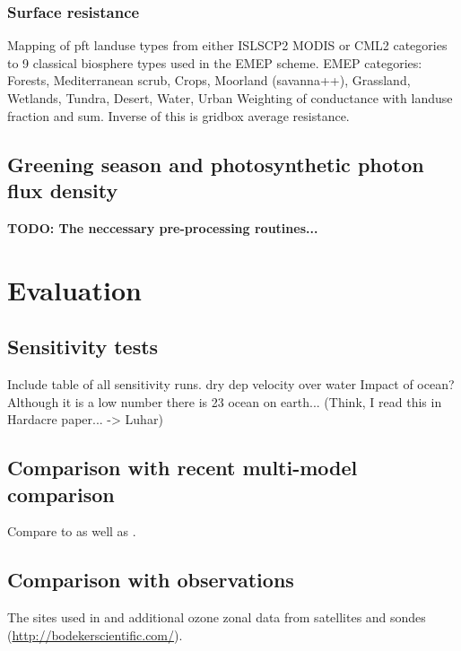 \documentclass[gmd, manuscript]{copernicus}
\begin{document}
\subsubsection{Surface resistance}
\label{subsubsec:Rc}
Mapping of pft landuse types from either ISLSCP2 MODIS or CML2 categories to 9 classical biosphere types used in the EMEP scheme. EMEP categories: Forests, Mediterranean scrub, Crops, Moorland (savanna++), Grassland, Wetlands, Tundra, Desert, Water, Urban
Weighting of conductance with landuse fraction and sum. Inverse of this is gridbox average resistance.

\subsection{Greening season and photosynthetic photon flux density}
\label{subsec:pre-pro}
      {\bf TODO: The neccessary pre-processing routines...}
      
\section{Evaluation}
\label{sec:eval}

\subsection{Sensitivity tests}
\label{subsec:sens}
Include table of all sensitivity runs.
\citep[e.g., $v^\chem{O_3}_{ice/snow} = 1/10000\,\unit{cm s^{-1}}$,][]{ACP:Helmig2007}
dry dep velocity over water \citep{JGR:Helmig2012} Impact of ocean? Although it is a low number there is 2\/3 ocean on earth... (Think, I read this in Hardacre paper... -> Luhar)

\subsection{Comparison with recent multi-model comparison}
\label{subsec:model}
Compare to \citet{ACP:Hardacre2015} as well as \citet{ACP:Luhar2017}.

\subsection{Comparison with observations}
\label{subsec:obs}
The sites used in \citet{ACP:Hardacre2015} and additional ozone zonal data from satellites and sondes (\url{http://bodekerscientific.com/}).
\end{document}
